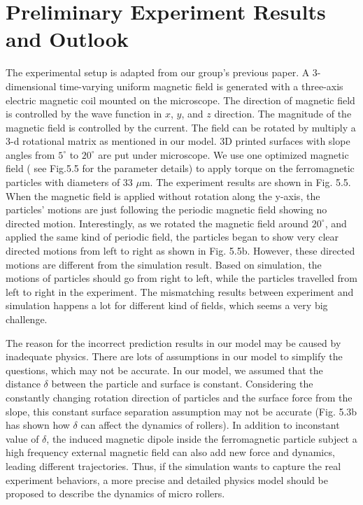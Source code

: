  \section{Preliminary Experiment Results and Outlook}
 The experimental setup is adapted from our group's previous paper\autocite{fei2018magneto, fei2019magneto}. A 3-dimensional time-varying uniform magnetic field is generated with a three-axis electric magnetic coil mounted on the microscope. The direction of magnetic field is controlled by the wave function in $x$, $y$, and $z$ direction. The magnitude of the magnetic field is controlled by the current. The field can be rotated by multiply a 3-d rotational matrix as mentioned in our model. 3D printed  surfaces with slope angles from $5^{\circ}$ to  $20^{\circ}$ are put under microscope. We use one optimized magnetic field ( see Fig.5.5 for the parameter details) to apply torque on the ferromagnetic particles with diameters of 33 $\mu$m. The experiment results are shown in Fig. 5.5. When the magnetic field is applied without rotation along the y-axis, the particles' motions are just following the periodic magnetic field showing no directed motion. Interestingly, as we rotated the magnetic field around $20^{\circ}$, and applied the same kind of periodic field, the particles began to show very clear directed motions from left to right as shown in Fig. 5.5b. However, these directed motions are different from the simulation result. Based on simulation, the motions of particles should go from right to left, while  the particles travelled from left to right in the experiment.
 The mismatching results between experiment and simulation happens a lot for different kind of fields, which seems a very big challenge. 
 
 The reason for the incorrect prediction results in our model may be caused by inadequate physics. There are lots of assumptions in our model to simplify the questions, which may not be accurate. In our model,  we assumed that the distance $\delta$ between the particle and surface is constant. Considering the constantly changing rotation direction of particles and the surface force from the slope, this constant surface separation assumption may not be accurate (Fig. 5.3b has shown how $\delta$ can affect the dynamics of rollers).  In addition to inconstant value of $\delta$,  the induced magnetic dipole inside the ferromagnetic particle subject a high frequency external magnetic field can also add new force and dynamics, leading different trajectories.  Thus, if the simulation wants to capture the real experiment behaviors, a more precise and detailed physics model should be proposed to  describe the dynamics of micro rollers.
 
